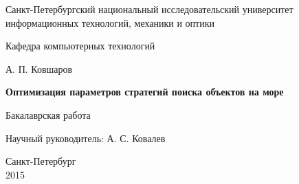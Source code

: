\documentclass{report}
\theoremstyle{plain}
\theoremstyle{definition}
\numberwithin{theorem}{chapter}        %
\begin{document}

\initializefrontsections

\pagestyle{title}

\begin{center}
Санкт-Петербургский национальный исследовательский университет \\ информационных технологий, механики и оптики

\vspace{2cm}

Кафедра компьютерных технологий

\vspace{3cm}

{\Large А. П. Ковшаров}

\vspace{2cm}

\vbox{\LARGE\bfseries
Оптимизация параметров стратегий поиска объектов на море}

\vspace{4cm}

Бакалаврская работа 

\vspace{1cm}

{\Large Научный руководитель: А. С. Ковалев}

\vspace{5cm}

Санкт-Петербург\\ 2015
\end{center}

\newpage

\setcounter{page}{2}
\pagestyle{plain}



\tableofcontents


\def\t#1{\mbox{\texttt{\hbox{#1}}}}
\def\b#1{\textbf{#1}}
\def\tb#1{\t{\b{#1}}}

\def\cln#1{\t{#1}}
\def\pcn#1{\t{#1}}
\newcommand{\p}{\par Здесь будет текст...}

\def\drawfigure#1#2#3{
        \begin{figure}[ht]
        \centerline{ \texttt{[image: img/\#1]}}
        \caption{#2}
        \label{#3}
        \end{figure}
}
\def\drawfigurex#1#2#3#4{
        \begin{figure}[ht]
        \centerline{ \texttt{[image: img/\#1]}}
        \caption{#2}
        \label{#3}
        \end{figure}
}

\startthechapters







%



\end{document}
